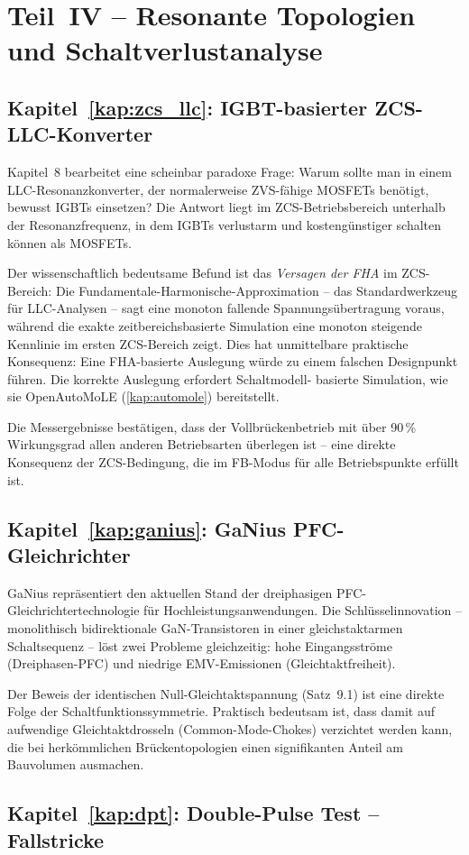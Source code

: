 ﻿\documentclass[a4paper,12pt,openany,oneside]{book}
\newcommand{\abschnitt}[1]{\section{#1}}
\newcommand{\unterabschnitt}[1]{\subsection{#1}}
\theoremstyle{definition}
\begin{document}
\abschnitt{Teil~IV -- Resonante Topologien und Schaltverlustanalyse}

\unterabschnitt{Kapitel~\ref{kap:zcs_llc}: IGBT-basierter ZCS-LLC-Konverter}

Kapitel~8 bearbeitet eine scheinbar paradoxe Frage: Warum sollte man in einem
LLC-Resonanzkonverter, der normalerweise ZVS-f\"ahige MOSFETs ben\"otigt, bewusst
IGBTs einsetzen? Die Antwort liegt im ZCS-Betriebsbereich unterhalb der Resonanzfrequenz,
in dem IGBTs verlustarm und kosteng\"unstiger schalten k\"onnen als MOSFETs.

Der wissenschaftlich bedeutsame Befund ist das \emph{Versagen der FHA} im ZCS-Bereich:
Die Fundamentale-Harmonische-Approximation -- das Standardwerkzeug f\"ur LLC-Analysen --
sagt eine monoton fallende Spannungs\"ubertragung voraus, w\"ahrend die exakte
zeitbereichsbasierte Simulation eine monoton steigende Kennlinie im ersten ZCS-Bereich
zeigt. Dies hat unmittelbare praktische Konsequenz: Eine FHA-basierte Auslegung w\"urde
zu einem falschen Designpunkt f\"uhren. Die korrekte Auslegung erfordert Schaltmodell-
basierte Simulation, wie sie OpenAutoMoLE (\autoref{kap:automole}) bereitstellt.

Die Messergebnisse best\"atigen, dass der Vollbr\"uckenbetrieb mit \"uber 90\,\%
Wirkungsgrad allen anderen Betriebsarten \"uberlegen ist -- eine direkte Konsequenz
der ZCS-Bedingung, die im FB-Modus f\"ur alle Betriebspunkte erf\"ullt ist.

\unterabschnitt{Kapitel~\ref{kap:ganius}: GaNius PFC-Gleichrichter}

GaNius repr\"asentiert den aktuellen Stand der dreiphasigen PFC-Gleichrichtertechnologie
f\"ur Hochleistungsanwendungen. Die Schl\"usselinnovation -- monolithisch bidirektionale
GaN-Transistoren in einer gleichstaktarmen Schaltsequenz -- l\"ost zwei Probleme
gleichzeitig: hohe Eingangsstr\"ome (Dreiphasen-PFC) und niedrige EMV-Emissionen
(Gleichtaktfreiheit).

Der Beweis der identischen Null-Gleichtaktspannung (Satz~9.1) ist eine direkte Folge
der Schaltfunktionssymmetrie. Praktisch bedeutsam ist, dass damit auf aufwendige
Gleichtaktdrosseln (Common-Mode-Chokes) verzichtet werden kann, die bei herk\"ommlichen
Br\"uckentopologien einen signifikanten Anteil am Bauvolumen ausmachen.

\unterabschnitt{Kapitel~\ref{kap:dpt}: Double-Pulse Test -- Fallstricke}
\end{document}

